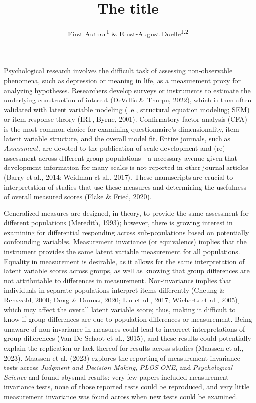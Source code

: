 \documentclass[
  man]{apa7}
\title{The title}
\author{First Author\textsuperscript{1} \& Ernst-August Doelle\textsuperscript{1,2}}
\date{}
\affiliation{\vspace{0.5cm}\textsuperscript{1} Wilhelm-Wundt-University\\\textsuperscript{2} Konstanz Business School}
\begin{document}
\maketitle

Psychological research involves the difficult task of assessing non-observable phenomena, such as depression or meaning in life, as a measurement proxy for analyzing hypotheses. Researchers develop surveys or instruments to estimate the underlying construction of interest (DeVellis \& Thorpe, 2022), which is then often validated with latent variable modeling (i.e., structural equation modeling; SEM) or item response theory (IRT, Byrne, 2001). Confirmatory factor analysis (CFA) is the most common choice for examining questionnaire's dimensionality, item-latent variable structure, and the overall model fit. Entire journals, such as \emph{Assessment,} are devoted to the publication of scale development and (re)-assessment across different group populations - a necessary avenue given that development information for many scales is not reported in other journal articles (Barry et al., 2014; Weidman et al., 2017). These manuscripts are crucial to interpretation of studies that use these measures and determining the usefulness of overall measured scores (Flake \& Fried, 2020).

Generalized measures are designed, in theory, to provide the same assessment for different populations (Meredith, 1993); however, there is growing interest in examining for differential responding across sub-populations based on potentially confounding variables. Measurement invariance (or equivalence) implies that the instrument provides the same latent variable measurement for all populations. Equality in measurement is desirable, as it allows for the same interpretation of latent variable scores across groups, as well as knowing that group differences are not attributable to differences in measurement. Non-invariance implies that individuals in separate populations interpret items differently (Cheung \& Rensvold, 2000; Dong \& Dumas, 2020; Liu et al., 2017; Wicherts et al., 2005), which may affect the overall latent variable score; thus, making it difficult to know if group differences are due to population differences or measurement. Being unaware of non-invariance in measures could lead to incorrect interpretations of group differences (Van De Schoot et al., 2015), and these results could potentially explain the replication or lack-thereof for results across studies (Maassen et al., 2023). Maassen et al. (2023) explores the reporting of measurement invariance tests across \emph{Judgment and Decision Making}, \emph{PLOS ONE}, and \emph{Psychological Science} and found abysmal results: very few papers included measurement invariance tests, none of those reported tests could be reproduced, and very little measurement invariance was found across when new tests could be examined.
\end{document}
